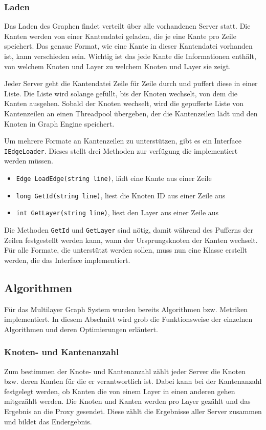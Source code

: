 \subsubsection{Laden}

Das Laden des Graphen findet verteilt über alle vorhandenen Server statt. Die Kanten werden von einer Kantendatei geladen, die je eine Kante pro Zeile speichert. Das genaue Format, wie eine Kante in dieser Kantendatei vorhanden ist, kann verschieden sein. Wichtig ist das jede Kante die Informationen enthält, von welchem Knoten und Layer zu welchem Knoten und Layer sie zeigt.

Jeder Server geht die Kantendatei Zeile für Zeile durch und puffert diese in einer Liste. Die Liste wird solange gefüllt, bis der Knoten wechselt, von dem die Kanten ausgehen. Sobald der Knoten wechselt, wird die gepufferte Liste von Kantenzeilen an einen Threadpool übergeben, der die Kantenzeilen lädt und den Knoten in Graph Engine speichert.

Um mehrere Formate an Kantenzeilen zu unterstützen, gibt es ein Interface \verb|IEdgeLoader|. Dieses stellt drei Methoden zur verfügung die implementiert werden müssen.

\begin{itemize}
  \item \verb|Edge LoadEdge(string line)|, lädt eine Kante aus einer Zeile
  \item \verb|long GetId(string line)|, liest die Knoten ID aus einer Zeile aus
  \item \verb|int GetLayer(string line)|, liest den Layer aus einer Zeile aus
\end{itemize}

Die Methoden \verb|GetId| und \verb|GetLayer| sind nötig, damit während des Pufferns der Zeilen festgestellt werden kann, wann der Ursprungsknoten der Kanten wechselt.
Für alle Formate, die unterstützt werden sollen, muss nun eine Klasse erstellt werden, die das Interface implementiert.


\subsection{Algorithmen}

Für das Multilayer Graph System wurden bereits Algorithmen bzw. Metriken implementiert. In diesem Abschnitt wird grob die Funktionsweise der einzelnen Algorithmen und deren Optimierungen erläutert.


\subsubsection{Knoten- und Kantenanzahl}
Zum bestimmen der Knote- und Kantenanzahl zählt jeder Server die Knoten bzw. deren Kanten für die er verantwortlich ist. Dabei kann bei der Kantenanzahl festgelegt werden, ob Kanten die von einem Layer in einen anderen gehen mitgezählt werden.
Die Knoten und Kanten werden pro Layer gezählt und das Ergebnis an die Proxy gesendet. Diese zählt die Ergebnisse aller Server zusammen und bildet das Endergebnis.
 

